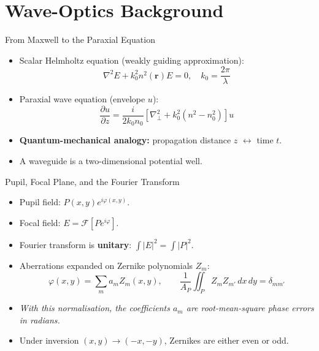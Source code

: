 \documentclass[aspectratio=169,10pt]{beamer}
\begin{document}
\section{Wave-Optics Background}
\begin{frame}{From Maxwell to the Paraxial Equation}
\begin{itemize}
    \item Scalar Helmholtz equation (weakly guiding approximation):
    \[
        \nabla^2 E + k_0^2 n^2(\mathbf{r}) E = 0, \quad k_0 = \frac{2\pi}{\lambda}
    \]
    \item Paraxial wave equation (envelope \(u\)):
    \[
        \frac{\partial u}{\partial z} = \frac{i}{2 k_0 n_0} \left[ \nabla_\perp^2 + k_0^2 (n^2 - n_0^2) \right] u
    \]
    \item \textbf{Quantum-mechanical analogy:} propagation distance \(z\) \(\leftrightarrow\) time \(t\).
    \item A waveguide is a two-dimensional potential well.
\end{itemize}
\end{frame}

\begin{frame}{Pupil, Focal Plane, and the Fourier Transform}
\begin{itemize}
    \item Pupil field: \(P(x,y) e^{i\varphi(x,y)}\).
    \item Focal field: \(E = \mathcal{F}[P e^{i\varphi}]\).
    \item Fourier transform is \textbf{unitary}: \(\int |E|^2 = \int |P|^2\).
    \item Aberrations expanded on Zernike polynomials \(Z_m\):
    \[
        \varphi(x,y) = \sum_m a_m Z_m(x,y), \qquad
        \frac{1}{A_P} \iint_P Z_m Z_{m'} \, dx\, dy = \delta_{m m'}
    \]
    \item \emph{With this normalisation, the coefficients $a_m$ are root-mean-square phase errors in radians.}
    \item Under inversion \((x,y) \to (-x,-y)\), Zernikes are either even or odd.
\end{itemize}
\end{frame}

\end{document}
